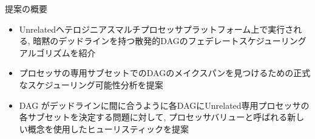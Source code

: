 
\begin{frame}{提案の概要}
    \begin{itemize}
        \item Unrelatedヘテロジニアスマルチプロセッサプラットフォーム上で実行される, 暗黙のデッドラインを持つ散発的DAGのフェデレートスケジューリングアルゴリズムを紹介

        \item プロセッサの専用サブセットでのDAGのメイクスパンを見つけるための正式なスケジューリング可能性分析を提案

        \item DAG がデッドラインに間に合うように各DAGにUnrelated専用プロセッサの各サブセットを決定する問題に対して, プロセッサバリューと呼ばれる新しい概念を使用したヒューリスティックを提案
    \end{itemize}
\end{frame}
